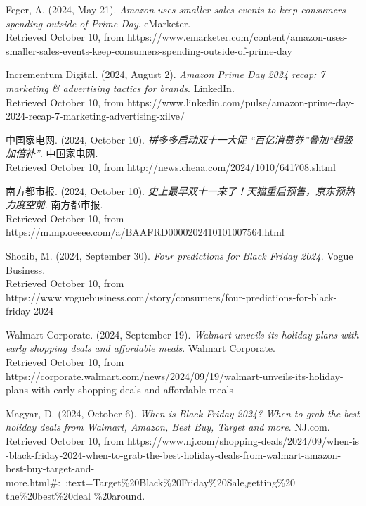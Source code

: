 \documentclass[12pt]{ctexart}
\begin{document}
\begin{thebibliography}{99}
     Feger, A. (2024, May 21).  \textit{Amazon uses smaller sales events to keep consumers spending outside of Prime Day}. eMarketer.\\ Retrieved October 10, from  https://www.emarketer.com/content/amazon-uses-smaller-sales-events-keep-consumers-spending-outside-of-prime-day

     Incrementum Digital. (2024, August 2).  \textit{Amazon Prime Day 2024 recap: 7 marketing \& advertising tactics for brands}. LinkedIn. \\ Retrieved October 10, from https://www.linkedin.com/pulse/amazon-prime-day-2024-recap-7-marketing-advertising-xilve/

     中国家电网. (2024, October 10). \textit{拼多多启动双十一大促 “百亿消费券”叠加“超级加倍补”}. 中国家电网. \\ Retrieved October 10, from 
    http://news.cheaa.com/2024/1010/641708.shtml

     南方都市报. (2024, October 10). \textit{史上最早双十一来了！天猫重启预售，京东预热力度空前}. 南方都市报. \\ Retrieved October 10, from https://m.mp.oeeee.com/a/BAAFRD0000202410101007564.html

     Shoaib, M. (2024, September 30). \textit{Four predictions for Black Friday 2024}. Vogue Business. \\ Retrieved October 10, from https://www.voguebusiness.com/story/consumers/four-predictions-for-black-friday-2024

     Walmart Corporate. (2024, September 19). \textit{Walmart unveils its holiday plans with early shopping deals and affordable meals}. Walmart Corporate.  \\ Retrieved October 10, from https://corporate.walmart.com/news/2024/09/19/walmart-unveils-its-holiday-plans-with-early-shopping-deals-and-affordable-meals

     Magyar, D. (2024, October 6). \textit{When is Black Friday 2024? When to grab the best holiday deals from Walmart, Amazon, Best Buy, Target and more}. NJ.com. \\ Retrieved October 10, from https://www.nj.com/shopping-deals/2024/09/when-is \\ -black-friday-2024-when-to-grab-the-best-holiday-deals-from-walmart-amazon-best-buy-target-and-more.html\#:~:text=Target\%20Black\%20Friday\%20Sale,getting\%20\\ the\%20best\%20deal \%20around.
    

\end{thebibliography}
\end{document}
